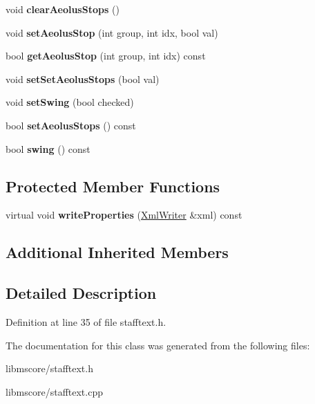 \begin{DoxyCompactItemize}
void {\bfseries clear\+Aeolus\+Stops} ()
\item 
\mbox{\label{class_ms_1_1_staff_text_a372011ab0eb22249cdda02409da7b8f5}} 
void {\bfseries set\+Aeolus\+Stop} (int group, int idx, bool val)
\item 
\mbox{\label{class_ms_1_1_staff_text_ac7a69bb864017fcb87b2c7dd7c3a3508}} 
bool {\bfseries get\+Aeolus\+Stop} (int group, int idx) const
\item 
\mbox{\label{class_ms_1_1_staff_text_a9a8175bcd70cb904378679170c539861}} 
void {\bfseries set\+Set\+Aeolus\+Stops} (bool val)
\item 
\mbox{\label{class_ms_1_1_staff_text_a870bc532617ab4f475e26d2d9d506a9e}} 
void {\bfseries set\+Swing} (bool checked)
\item 
\mbox{\label{class_ms_1_1_staff_text_a2b0ab4ee6590aedc504dd7c9d9d7ee26}} 
bool {\bfseries set\+Aeolus\+Stops} () const
\item 
\mbox{\label{class_ms_1_1_staff_text_a1f88d68857a5eab3c915b16b221aa934}} 
bool {\bfseries swing} () const
\end{DoxyCompactItemize}
\subsection*{Protected Member Functions}
\begin{DoxyCompactItemize}
\item 
\mbox{\label{class_ms_1_1_staff_text_a9e31ec0d1e4f2a9f56e57f7a08600a7f}} 
virtual void {\bfseries write\+Properties} (\hyperlink{class_ms_1_1_xml_writer}{Xml\+Writer} \&xml) const
\end{DoxyCompactItemize}
\subsection*{Additional Inherited Members}


\subsection{Detailed Description}


Definition at line 35 of file stafftext.\+h.



The documentation for this class was generated from the following files\+:\begin{DoxyCompactItemize}
\item 
libmscore/stafftext.\+h\item 
libmscore/stafftext.\+cpp\end{DoxyCompactItemize}
